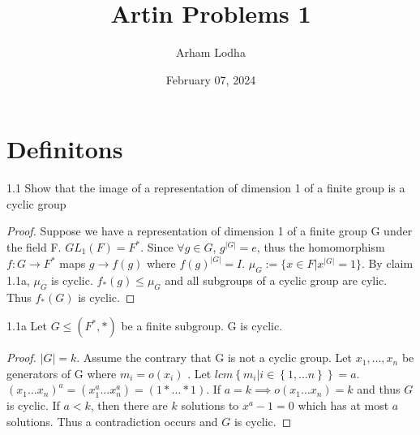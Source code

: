 \documentclass{article}
\begin{document}
\title{Artin Problems 1}
\author{Arham Lodha}%
\date{February 07, 2024}%
\maketitle

\section{Definitons}
\begin{PROB}{1.1}\label{Problem 1.1.}
    Show that the image of a representation of dimension 1 of a finite group is a cyclic group
\end{PROB}
\begin{proof}
    Suppose we have a representation of dimension 1 of a finite group G under the field F.
    $GL_1(F) = F^*$. Since $\forall g \in G$, $g^{|G|} = e$, thus the homomorphism $f: G \to F^*$ maps $g \to f(g)$ where $f(g)^{|G|} = I$. $\mu_G := \{x \in F | x^{|G|}= 1\}$. By claim 1.1a, $\mu_G$ is cyclic. $f_*(g) \leq \mu_G$ and all subgroups of a cyclic group are cylic. Thus $f_*(G)$ is cyclic.
\end{proof}
\begin{claim}{1.1a}\label{Claim 1.1a.}
    Let $G \leq (F^*, *)$ be a finite subgroup. G is cyclic. 
\end{claim}
\begin{proof}
    $|G| = k$. Assume the contrary that G is not a cyclic group. Let $x_1, \dots, x_n$ be generators of G where $m_i = o(x_i)$ . Let $lcm \left\{ m_i | i \in \left\{ 1, \dots n \right\} \right\} = a$.  $(x_1 \dots x_n)^a = (x_1^a ... x_n^a) = (1 * \dots * 1)$. If $a = k \implies o(x_1 \dots x_n) = k$ and thus $G$ is cyclic. If $a < k$, then there are $k$ solutions to $x^a - 1 = 0$ which has at most $a$ solutions. Thus a contradiction occurs and $G$ is cyclic.                               
\end{proof}

\bigskip
\end{document}
